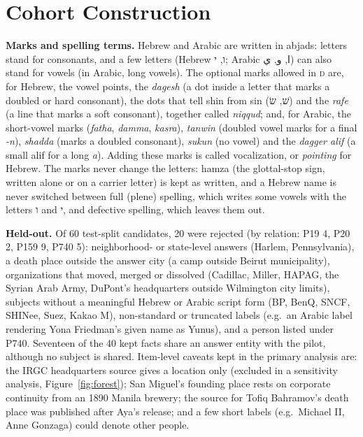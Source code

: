 \documentclass[11pt]{article}
\newcommand{\he}[1]{\mbox{\beginR\hebfont #1\endR}}
\newcommand{\ar}[1]{\mbox{\beginR\arabfont #1\endR}}
\newcommand{\D}{\textsc{d}}
\begin{document}
\section{Cohort Construction}
\label{app:cohorts}
\textbf{Marks and spelling terms.} Hebrew and Arabic are written in abjads:
letters stand for consonants, and a few letters (Hebrew \he{ו}, \he{י}; Arabic
\ar{ا}, \ar{و}, \ar{ي}) can also stand for vowels (in Arabic, long vowels). The
optional marks allowed in \D{} are, for Hebrew, the vowel points, the
\emph{dagesh} (a dot inside a letter that marks a doubled or hard consonant), the
dots that tell shin from sin (\he{שׁ}, \he{שׂ}) and the \emph{rafe} (a line that
marks a soft consonant), together called \emph{niqqud}; and, for Arabic, the short-vowel marks (\emph{fatha},
\emph{damma}, \emph{kasra}), \emph{tanwin} (doubled vowel marks for a final
\emph{-n}), \emph{shadda} (marks a doubled consonant), \emph{sukun} (no vowel) and the
\emph{dagger alif} (a small alif for a long \emph{a}). Adding these marks is
called vocalization, or \emph{pointing} for Hebrew. The marks never change the
letters: hamza (the glottal-stop sign, written alone or on a carrier letter) is
kept as written, and a Hebrew name is never switched
between full (plene) spelling, which writes some vowels with the letters \he{ו}
and \he{י}, and defective spelling, which leaves them out.

\textbf{Held-out.} Of 60 test-split candidates, 20 were rejected (by relation:
P19 4, P20 2, P159 9, P740 5): neighborhood- or state-level answers (Harlem,
Pennsylvania), a death place outside the answer city (a camp outside Beirut
municipality), organizations that moved, merged or dissolved (Cadillac, Miller,
HAPAG, the Syrian Arab Army, DuPont's headquarters outside Wilmington city
limits), subjects without a meaningful Hebrew or Arabic script form (BP, BenQ,
SNCF, SHINee, Suez, Kakao M), non-standard or truncated labels (e.g.\ an Arabic
label rendering Yona Friedman's given name as Yunus), and a person listed under
P740. Seventeen of the 40 kept facts share an answer entity with the pilot,
although no subject is shared. Item-level caveats kept in the primary analysis
are: the IRGC headquarters source gives a location only (excluded in a
sensitivity analysis, Figure~\ref{fig:forest}); San Miguel's founding place
rests on corporate continuity from an 1890 Manila brewery; the source for Tofiq
Bahramov's death place was published after Aya's release; and a few short labels
(e.g.\ Michael II, Anne Gonzaga) could denote other people.
\end{document}
